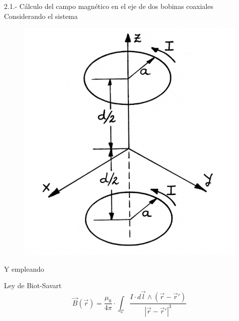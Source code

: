 \documentclass{beamer}
\providecommand{\abs}[1]{\left|#1\right|}
\begin{document}
\begin{frame}{2.1.- Cálculo del campo magnético en el eje de dos bobinas coaxiales}
    Considerando el sistema \pause \vspace{-1.5cm}\begin{figure}
        \centering
        \includegraphics[scale = 0.1]{imagen_2023-04-16_100309859.png}
    \end{figure}
    Y empleando \begin{block}{Ley de Biot-Savart}
        \begin{equation}
            \vec{B}(\vec{r}) = \frac{\mu_{0}}{4 \pi} \cdot \int_{\mathcal{C}} \frac{I \cdot d\vec{l} \wedge (\vec{r} - \vec{r}')}{\abs{\vec{r} - \vec{r}'}^{3}} \nonumber
        \end{equation}
        \end{block}
\end{frame}
\end{document}
